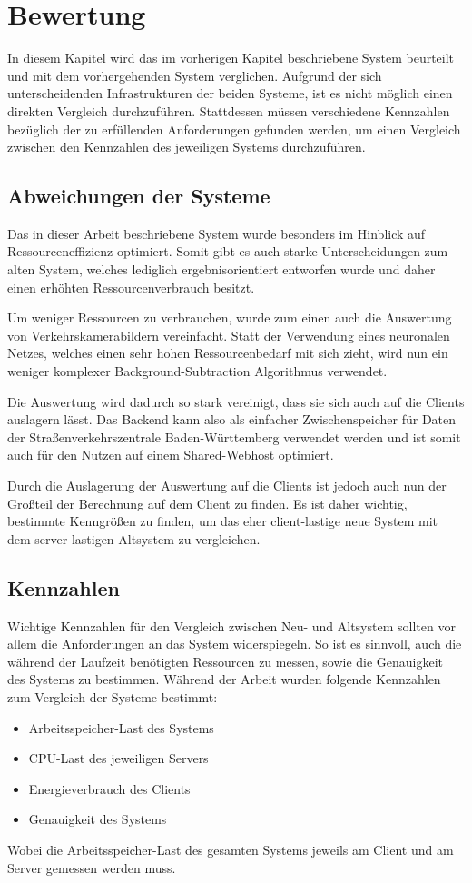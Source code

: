 \chapter{Bewertung}
In diesem Kapitel wird das im vorherigen Kapitel beschriebene System beurteilt und mit dem vorhergehenden System verglichen.
Aufgrund der sich unterscheidenden Infrastrukturen der beiden Systeme, ist es nicht möglich einen direkten Vergleich durchzuführen.
Stattdessen müssen verschiedene Kennzahlen bezüglich der zu erfüllenden Anforderungen gefunden werden, um einen Vergleich zwischen den Kennzahlen des jeweiligen Systems durchzuführen.

\section{Abweichungen der Systeme}
Das in dieser Arbeit beschriebene System wurde besonders im Hinblick auf Ressourceneffizienz optimiert.
Somit gibt es auch starke Unterscheidungen zum alten System, welches lediglich ergebnisorientiert entworfen wurde und daher einen erhöhten Ressourcenverbrauch besitzt.

Um weniger Ressourcen zu verbrauchen, wurde zum einen auch die Auswertung von Verkehrskamerabildern vereinfacht.
Statt der Verwendung eines neuronalen Netzes, welches einen sehr hohen Ressourcenbedarf mit sich zieht, wird nun ein weniger komplexer Background-Subtraction Algorithmus verwendet.

Die Auswertung wird dadurch so stark vereinigt, dass sie sich auch auf die Clients auslagern lässt.
Das Backend kann also als einfacher Zwischenspeicher für Daten der Straßenverkehrszentrale Baden-Württemberg verwendet werden und ist somit auch für den Nutzen auf einem Shared-Webhost optimiert.

Durch die Auslagerung der Auswertung auf die Clients ist jedoch auch nun der Großteil der Berechnung auf dem Client zu finden.
Es ist daher wichtig, bestimmte Kenngrößen zu finden, um das eher client-lastige neue System mit dem server-lastigen Altsystem zu vergleichen.

\section{Kennzahlen}
Wichtige Kennzahlen für den Vergleich zwischen Neu- und Altsystem sollten vor allem die Anforderungen an das System widerspiegeln.
So ist es sinnvoll, auch die während der Laufzeit benötigten Ressourcen zu messen, sowie die Genauigkeit des Systems zu bestimmen.
Während der Arbeit wurden folgende Kennzahlen zum Vergleich der Systeme bestimmt:
\begin{itemize}
\item{Arbeitsspeicher-Last des Systems}
\item{CPU-Last des jeweiligen Servers}
\item{Energieverbrauch des Clients}
\item{Genauigkeit des Systems}
\end{itemize}
Wobei die Arbeitsspeicher-Last des gesamten Systems jeweils am Client und am Server gemessen werden muss.

